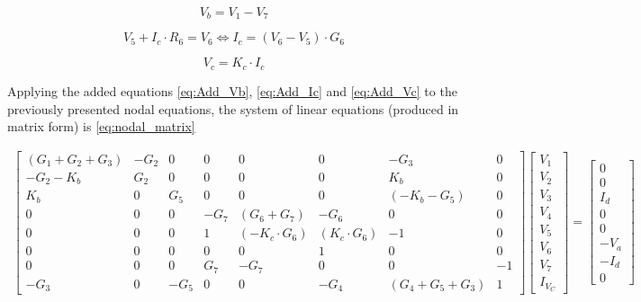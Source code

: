 \begin{equation}
    V_b = V_1 - V_7
    \label{eq:Add_Vb}
\end{equation}

\begin{equation}
    V_5 + I_c \cdot R_6 = V_6 \Leftrightarrow I_c = (V_6 - V_5) \cdot G_6
    \label{eq:Add_Ic}
\end{equation}

\begin{equation}
    V_c = K_c \cdot I_c
    \label{eq:Add_Vc}
\end{equation}


Applying the added equations \ref{eq:Add_Vb}, \ref{eq:Add_Ic} and \ref{eq:Add_Vc} to the previously presented nodal 
equations, the system of linear equations (produced in matrix form) is \ref{eq:nodal_matrix}

\begin{gather}
  \begin{bmatrix} 
    (G_1 + G_2 + G_3) & -G_2 & 0 & 0 & 0 & 0 & -G_3 & 0 \\ -G_2 - K_b & G_2 & 0 & 0 & 0 & 0 & K_b & 0 \\ K_b & 0 & G_5 & 0 & 0 & 0 & (-K_b-G_5) & 0 \\ 0 & 0 & 0 & -G_7 & (G_6+G_7) & -G_6 & 0 & 0 \\ 0 & 0 & 0 & 1 & (-K_c \cdot G_6) & (K_c \cdot G_6) & -1 & 0 \\ 0 & 0 & 0 & 0 & 0 & 1 & 0 & 0 \\ 0 & 0 & 0 & G_7 & -G_7 & 0 & 0 & -1 \\ -G_3 & 0 & -G_5 & 0 & 0 & -G_4 & (G_4 + G_5 + G_3) & 1  
  \end{bmatrix}
  \begin{bmatrix}
    V_1 \\ V_2 \\ V_3 \\ V_4 \\ V_5 \\ V_6 \\ V_7 \\ I_{V_C}
  \end{bmatrix}
    =
  \begin{bmatrix}
    0 \\ 0 \\ I_d \\ 0 \\ 0 \\ -V_a \\ -I_d \\ 0
  \end{bmatrix}
  \label{eq:nodal_matrix}
\end{gather}


